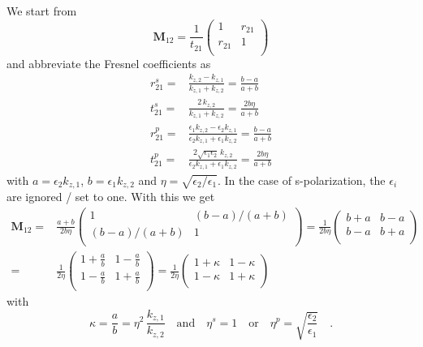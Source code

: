 We start from 
\begin{equation}
\mathbf{M}_{12} = \frac{1}{t_{21}} 
\begin{pmatrix}
1 & r_{21} \\ r_{21} & 1 \\
\end{pmatrix}
\end{equation}
and abbreviate the Fresnel coefficients as
\begin{align}
  r_{21}^s = & \frac{k_{z,2} - k_{z,1}}{k_{z,1} + k_{z,2}}  = \frac{b - a}{a + b} \\
 t_{21}^s = & \frac{2 \, k_{z,2}}{k_{z,1} + k_{z,2}} =   \frac{2 b \eta }{a + b}   \\
  r_{21}^p = & \frac{\epsilon_1	 k_{z,2} - \epsilon_2 k_{z,1}}
				  {\epsilon_2 k_{z,1} + \epsilon_1 k_{z,2}}  =   \frac{b - a}{a + b}\\
  t_{21}^p = & \frac{2 \sqrt{\epsilon_1 \epsilon_2}	 \,k_{z,2} }
				  {\epsilon_2 k_{z,1} + \epsilon_1 k_{z,2}}  =   \frac{2 b  \eta }{a + b} 
\end{align}
with $a = \epsilon_2 k_{z,1}$, $b =     \epsilon_1 k_{z,2}$ and $\eta = \sqrt{\epsilon_2 / \epsilon_1}$. In the case of s-polarization, the $\epsilon_i$ are ignored / set to one. With this we get
\begin{align}
\mathbf{M}_{12} = & \frac{a+b}{2 b \eta} 
\begin{pmatrix}
1 & (b-a)/(a+b) \\  (b-a)/(a+b) & 1 \\
\end{pmatrix}
= 
 \frac{1}{2 b \eta} 
\begin{pmatrix}
b+a & b-a \\  b-a & b+a \\
\end{pmatrix} \\
= &
 \frac{1}{2  \eta} 
\begin{pmatrix}
1+\frac{a}{b} & 1- \frac{a}{b} \\  1- \frac{a}{b} & 1+\frac{a}{b} \\
\end{pmatrix}
= 
 \frac{1}{2  \eta} 
\begin{pmatrix}
1+\kappa & 1- \kappa \\  1- \kappa & 1+\kappa \\
\end{pmatrix} 
\end{align}
with 
\begin{equation}
\kappa = \frac{a}{b} = \eta^2 \,
\frac{  k_{z,1} }{ k_{z,2}}
\quad
\text{and}
\quad
\eta^s = 1 \quad \text{or} \quad \eta^p = \sqrt{ \frac{\epsilon_2}{\epsilon_1} } \quad .
\end{equation}





\printbibliography[segment=\therefsegment,heading=subbibliography]




